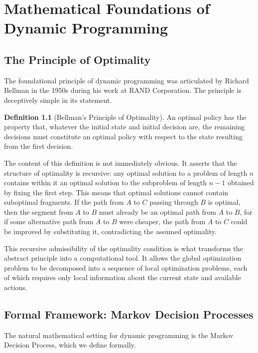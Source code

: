 \documentclass[12pt, a4paper, openany]{book}
\theoremstyle{plain}
\theoremstyle{definition}
\newtheorem{definition}[theorem]{Definition}
\theoremstyle{remark}
\begin{document}
\chapter{Mathematical Foundations of Dynamic Programming}

\section{The Principle of Optimality}

The foundational principle of dynamic programming was articulated by Richard Bellman in the 1950s during his work at RAND Corporation. The principle is deceptively simple in its statement.

\begin{definition}[Bellman's Principle of Optimality]
An optimal policy has the property that, whatever the initial state and initial decision are, the remaining decisions must constitute an optimal policy with respect to the state resulting from the first decision.
\end{definition}

The content of this definition is not immediately obvious. It asserts that the structure of optimality is recursive: any optimal solution to a problem of length $n$ contains within it an optimal solution to the subproblem of length $n-1$ obtained by fixing the first step. This means that optimal solutions cannot contain suboptimal fragments. If the path from $A$ to $C$ passing through $B$ is optimal, then the segment from $A$ to $B$ must already be an optimal path from $A$ to $B$, for if some alternative path from $A$ to $B$ were cheaper, the path from $A$ to $C$ could be improved by substituting it, contradicting the assumed optimality.

This recursive admissibility of the optimality condition is what transforms the abstract principle into a computational tool. It allows the global optimization problem to be decomposed into a sequence of local optimization problems, each of which requires only local information about the current state and available actions.

\section{Formal Framework: Markov Decision Processes}

The natural mathematical setting for dynamic programming is the Markov Decision Process, which we define formally.
\end{document}
